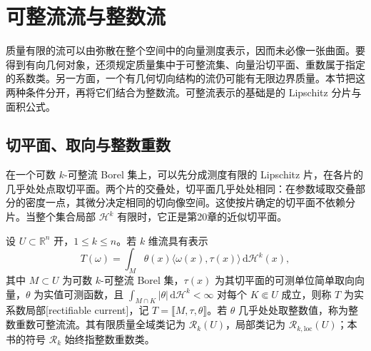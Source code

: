 
% 
% 

\section{可整流流与整数流}
\label{g3:sec:2202}

质量有限的流可以由弥散在整个空间中的向量测度表示，因而未必像一张曲面。要得到有向几何对象，还须规定质量集中于可整流集、向量沿切平面、重数属于指定的系数类。另一方面，一个有几何切向结构的流仍可能有无限边界质量。本节把这两种条件分开，再将它们结合为整数流。可整流表示的基础是的 Lipschitz 分片与面积公式。

\subsection{切平面、取向与整数重数}
\label{g3:subsec:2202:01}
在一个可数 \(k\)-可整流 Borel 集上，可以先分成测度有限的 Lipschitz 片，在各片的几乎处处点取切平面。两个片的交叠处，切平面几乎处处相同：在参数域取交叠部分的密度一点，其微分决定相同的切向像空间。这使按片确定的切平面不依赖分片。当整个集合局部 \(\mathcal H^k\) 有限时，它正是第20章的近似切平面。

\begin{definition}\label{g3:def:rectifiable-current}
	设 \(U\subset\mathbb R^n\) 开，\(1\le k\le n\)。若 \(k\) 维流具有表示
	\begin{equation}\label{g3:eq:rectifiable-current-representation}
		T(\omega)=\int_M\theta(x)\langle\omega(x),\tau(x)\rangle\,
		\mathrm d\mathcal H^k(x),
	\end{equation}
	其中 \(M\subset U\) 为可数 \(k\)-可整流 Borel 集，\(\tau(x)\) 为其切平面的可测单位简单取向向量，\(\theta\) 为实值可测函数，且 \(\int_{M\cap K}|\theta|\,\mathrm d\mathcal H^k<\infty\) 对每个 \(K\Subset U\) 成立，则称 \(T\) 为实系数局部[rectifiable current]，记 \(T=\lBrack M,\tau,\theta\rBrack\)。若 \(\theta\) 几乎处处取整数值，称为整数重数可整流流。其有限质量全域类记为 \(\mathcal R_k(U)\)，局部类记为 \(\mathcal R_{k,\mathrm{loc}}(U)\)；本书的符号 \(\mathcal R_k\) 始终指整数重数类。
\end{definition}

